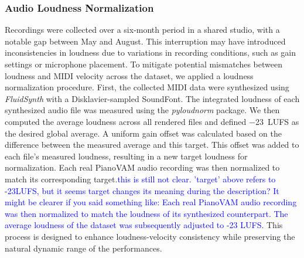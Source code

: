 \documentclass{article}
\newcommand{\alex}[1]{\textcolor{blue}{#1}}%
\begin{document}
\subsubsection{Audio Loudness Normalization}
Recordings were collected over a six-month period in a shared studio, with a notable gap between May and August. This interruption may have introduced inconsistencies in loudness due to variations in recording conditions, such as gain settings or microphone placement. To mitigate potential mismatches between loudness and MIDI velocity across the dataset, we applied a loudness normalization procedure. First, the collected MIDI data were synthesized using \textit{FluidSynth} with a Disklavier-sampled SoundFont. The integrated loudness of each synthesized audio file was measured using the \textit{pyloudnorm} package. We then computed the average loudness across all rendered files and defined $-$23~\si{LUFS} as the desired global average. A uniform gain offset was calculated based on the difference between the measured average and this target. This offset was added to each file's measured loudness, resulting in a new target loudness for normalization. Each real PianoVAM audio recording was then normalized to match its corresponding target.\alex{this is still not clear. 'target' above refers to -23LUFS, but it seems target changes its meaning during the description? It might be clearer if you said something like: Each real PianoVAM audio recording was then normalized to match the loudness of its synthesized counterpart. The average loudness of the dataset was subsequently adjusted to -23 LUFS.} This process is designed to enhance loudness-velocity consistency while preserving the natural dynamic range of the performances.


\end{document}
